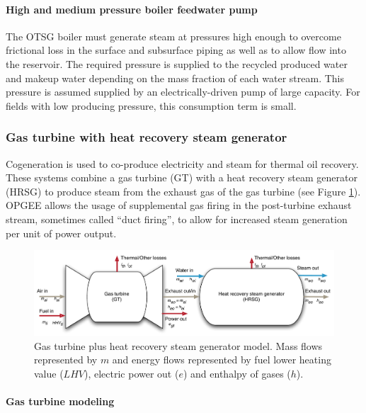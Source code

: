 \documentclass[11pt]{report}
\begin{document}
\paragraph{High and medium pressure boiler feedwater pump}

The OTSG boiler must generate steam at pressures high enough to overcome frictional loss in the surface and subsurface piping as well as to allow flow into the reservoir.  The required pressure is supplied to the recycled produced water and makeup water depending on the mass fraction of each water stream.  This pressure is assumed supplied by an electrically-driven pump of large capacity.  For fields with low producing pressure, this consumption term is small.


\subsubsection{Gas turbine with heat recovery steam generator}

Cogeneration is used to co-produce electricity and steam for thermal oil recovery. These systems combine a gas turbine (GT) with a heat recovery steam generator (HRSG) to produce steam from the exhaust gas of the gas turbine (see Figure \ref{fig:GT-HRSG}).  OPGEE allows the usage of supplemental gas firing in the post-turbine exhaust stream, sometimes called ``duct firing'', to allow for increased steam generation per unit of power output.

\begin{figure}[t]
\includegraphics[width=1\columnwidth]{images/GT+HRSG.pdf}
\caption{Gas turbine plus heat recovery steam generator model. Mass flows represented by $m$ and energy flows represented by fuel lower heating value ($LHV$), electric power out ($e$) and enthalpy of gases ($h$).}
\label{fig:GT-HRSG}
\end{figure}

\paragraph{Gas turbine modeling} 
\end{document}
